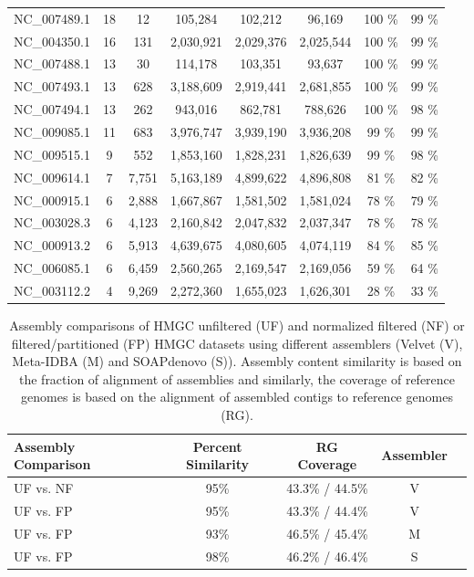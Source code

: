 \documentclass{pnastwo}
\begin{document}
\begin{table}
\begin{tabular}{@{\extracolsep{\fill}}l c c c c c c c}
NC\_007489.1 & 18
& 12 & 105,284 & 102,212 & 96,169 & 100 \% & 99 \% \\
NC\_004350.1 & 16
& 131 & 2,030,921 & 2,029,376 & 2,025,544 & 100 \% & 99 \% \\
NC\_007488.1 & 13
& 30 & 114,178 & 103,351 & 93,637 & 100 \% & 99 \% \\
NC\_007493.1 & 13
& 628 & 3,188,609 & 2,919,441 & 2,681,855 & 100 \% & 99 \% \\
NC\_007494.1 & 13
& 262 & 943,016 & 862,781 & 788,626 & 100 \% & 98 \% \\
NC\_009085.1 &
11 & 683 & 3,976,747 & 3,939,190 & 3,936,208 & 99 \% & 99 \% \\
NC\_009515.1 & 9
& 552 & 1,853,160 & 1,828,231 & 1,826,639 & 99 \% & 98 \% \\
NC\_009614.1 & 7
& 7,751 & 5,163,189 & 4,899,622 & 4,896,808 & 81 \% & 82 \% \\
NC\_000915.1 & 6
& 2,888 & 1,667,867 & 1,581,502 & 1,581,024 & 78 \% & 79 \% \\
NC\_003028.3 & 6
& 4,123 & 2,160,842 & 2,047,832 & 2,037,347 & 78 \% & 78 \% \\
NC\_000913.2 & 6
& 5,913 & 4,639,675 & 4,080,605 & 4,074,119 & 84 \% & 85 \% \\
NC\_006085.1 & 6
& 6,459 & 2,560,265 & 2,169,547 & 2,169,056 & 59 \% & 64 \% \\
NC\_003112.2 & 4
& 9,269 & 2,272,360 & 1,655,023 & 1,626,301 & 28 \% & 33 \% \\
\hline
\end{tabular}
\label{ref-summary}
\end{table}


\begin{table}
\caption{Assembly comparisons of HMGC unfiltered (UF) and normalized filtered (NF) or
  filtered/partitioned (FP) HMGC datasets using different
  assemblers (Velvet (V), Meta-IDBA (M) and SOAPdenovo (S)).  Assembly
  content similarity is based on the fraction of alignment of
  assemblies and similarly, the coverage of reference genomes is based
  on the alignment of assembled contigs to reference genomes (RG).}
\begin{tabular}{@{\extracolsep{\fill}}lcccc}
Assembly Comparison & Percent Similarity & RG Coverage & Assembler \\
\hline
UF vs. NF & 95\% & 43.3\% / 44.5\% & V \\
UF vs. FP & 95\% & 43.3\% / 44.4\% & V\\
UF vs. FP & 93\% & 46.5\% / 45.4\% & M\\ 
UF vs. FP & 98\% &  46.2\% / 46.4\% & S\\
\hline
\end{tabular}
\label{assembly-compare}
\end{table}
\end{document}
